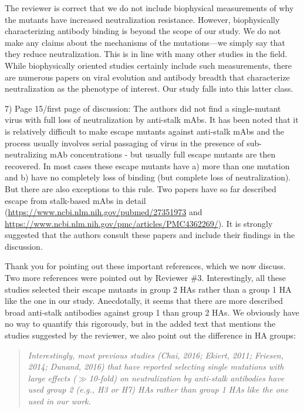 \documentclass[11pt, oneside]{article}   	%
\begin{document}
{\color{black}
The reviewer is correct that we do not include biophysical measurements of why the mutants have increased neutralization resistance.
However, biophysically characterizing antibody binding is beyond the scope of our study.
We do not make any claims about the mechanisms of the mutations---we simply say that they reduce neutralization.
This is in line with many other studies in the field.
While biophysically oriented studies certainly include such measurements, there are numerous papers on viral evolution and antibody breadth that characterize neutralization as the phenotype of interest.
Our study falls into this latter class.
}

7) Page 15/first page of discussion: The authors did not find a single-mutant virus with full loss of neutralization by anti-stalk mAbs. It has been noted that it is relatively difficult to make escape mutants against anti-stalk mAbs and the process usually involves serial passaging of virus in the presence of sub-neutralizing mAb concentrations - but usually full escape mutants are then recovered. In most cases these escape mutants have a) more than one mutation and b) have no completely loss of binding (but complete loss of neutralization). But there are also exceptions to this rule. Two papers have so far described escape from stalk-based mAbs in detail (\url{https://www.ncbi.nlm.nih.gov/pubmed/27351973} and \url{https://www.ncbi.nlm.nih.gov/pmc/articles/PMC4362269/}). It is strongly suggested that the authors consult these papers and include their findings in the discussion.

{\color{black}
Thank you for pointing out these important references, which we now discuss.
Two more references were pointed out by Reviewer \#3.
Interestingly, all these studies selected their escape mutants in group 2 HAs rather than a group 1 HA like the one in our study.
Anecdotally, it seems that there are more described broad anti-stalk antibodies against group 1 than group 2 HAs.
We obviously have no way to quantify this rigorously, but in the added text that mentions the studies suggested by the reviewer, we also point out the difference in HA groups:

\begin{quote}
\textsl{Interestingly, most previous studies (Chai, 2016; Ekiert, 2011; Friesen, 2014; Dunand, 2016) that have reported selecting single mutations with large effects ($\gg$10-fold) on neutralization by anti-stalk antibodies have used group 2 (e.g., H3 or H7) HAs rather than group 1 HAs like the one used in our work.}
\end{quote}
}
\end{document}
